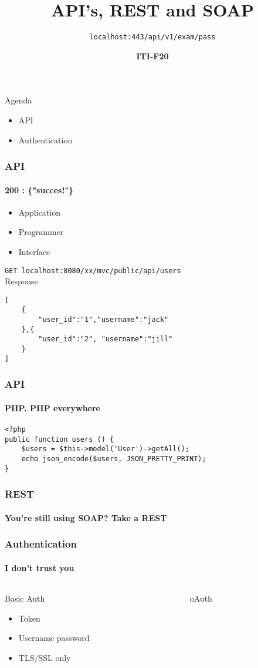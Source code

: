 \documentclass[aspectratio=169,10pt,t]{beamer}
\title{API's, REST and SOAP}
\subtitle{ \texttt{localhost:443/api/v1/exam/pass} }
\date{ }
\author{
  \textbf{ITI-F20}
}
\institute[
  SDU Robotics\\
  The Maersk Mc-Kinney Moller Institute\\
  University of Southern Denmark
] %
{%
  SDU Robotics\\
  The Maersk Mc-Kinney Moller Institute\\
  University of Southern Denmark

}
\begin{document}
{\SDUwavesbg%
\begin{frame} %
  \titlepage
\end{frame}}

\begin{frame}{Agenda}{\vphantom{(y}}
\begin{itemize}
		\item API
		\item Authentication
	\end{itemize}
\end{frame}


\begin{frame}[fragile]
	\frametitle{API}
	\framesubtitle{200 : \{"succes!"\}}
	\begin{itemize}
		\item Application
		\item Programmer
		\item Interface
	\end{itemize}

	\vfill
	\texttt{GET localhost:8080/xx/mvc/public/api/users}\\
	Response
	\begin{verbatim}
[
	{
		"user_id":"1","username":"jack"
	},{
		"user_id":"2", "username":"jill"
	}
]	
	\end{verbatim}
\end{frame}

\begin{frame}[fragile]
	\frametitle{API}
	\framesubtitle{PHP. PHP everywhere}
	\begin{verbatim}
<?php
public function users () {
	$users = $this->model('User')->getAll();
	echo json_encode($users, JSON_PRETTY_PRINT);
}
	\end{verbatim}
\end{frame}

\begin{frame}[fragile]
	\frametitle{REST}
	\framesubtitle{You're still using SOAP? Take a REST}

\end{frame}


\begin{frame}[fragile]
	\frametitle{Authentication}
	\framesubtitle{I don't trust you}
	\begin{columns}
		\begin{column}{0.5\textwidth}
			Basic Auth
			\begin{itemize}
				\item Token
				\item Username password
				\item TLS/SSL only
			\end{itemize}
		\end{column}
		\begin{column}{0.5\textwidth}
			oAuth

		\end{column}
	\end{columns}
\end{frame}
\end{document}

